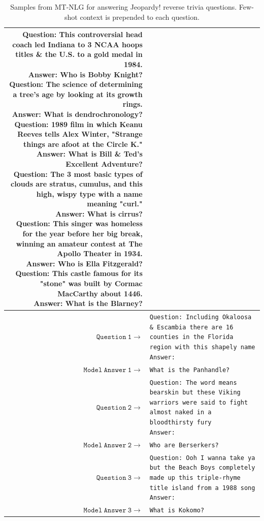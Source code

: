\documentclass[11pt]{article}
\newcommand{\ours}{MT-NLG}
\begin{document}
\begin{table}[t]
\begin{adjustbox}{height=4.1in}
\begin{tabularx}{1.11\textwidth}{rX}
{Question: This controversial head coach led Indiana to 3 NCAA hoops titles \& the U.S. to a gold medal in 1984.\newline
Answer: Who is Bobby Knight?\newline
Question: The science of determining a tree’s age by looking at its growth rings.\newline
Answer: What is dendrochronology?\newline
Question: 1989 film in which Keanu Reeves tells Alex Winter, "Strange things are afoot at the Circle K."\newline
Answer: What is Bill \& Ted's Excellent Adventure?\newline
Question: The 3 most basic types of clouds are stratus, cumulus, and this high, wispy type with a name meaning "curl."\newline
Answer: What is cirrus?\newline
Question: This singer was homeless for the year before her big break, winning an amateur contest at The Apollo Theater in 1934.\newline
Answer: Who is Ella Fitzgerald?\newline
Question: This castle famous for its "stone" was built by Cormac MacCarthy about 1446.\newline
Answer: What is the Blarney?
}
 \\
 \midrule
\textbf{$\mathtt{Question~1 \rightarrow}$} &  \texttt{Question: Including Okaloosa \& Escambia there are 16 counties in the Florida region with this shapely name\newline
Answer:
}
 \\
\textbf{$\mathtt{Model~Answer~1 \rightarrow}$} &  \texttt{What is the Panhandle?}
 \\
 \midrule
\textbf{$\mathtt{Question~2 \rightarrow}$} &  \texttt{Question: The word means bearskin but these Viking warriors were said to fight almost naked in a bloodthirsty fury\newline
Answer:
}
 \\
\textbf{$\mathtt{Model~Answer~2 \rightarrow}$} &  \texttt{Who are Berserkers?}
 \\
 \midrule
\textbf{$\mathtt{Question~3 \rightarrow}$} &  \texttt{Question: Ooh I wanna take ya but the Beach Boys completely made up this triple-rhyme title island from a 1988 song\newline
Answer:
}
 \\
\textbf{$\mathtt{Model~Answer~3 \rightarrow}$} &  \texttt{What is Kokomo?}
 \\
\bottomrule
\end{tabularx}
\end{adjustbox}
\caption{Samples from {\ours} for answering Jeopardy! reverse trivia questions. Few-shot context is prepended to each question.}
\label{tab:jeopardy-questions}
\end{table}
\end{document}
